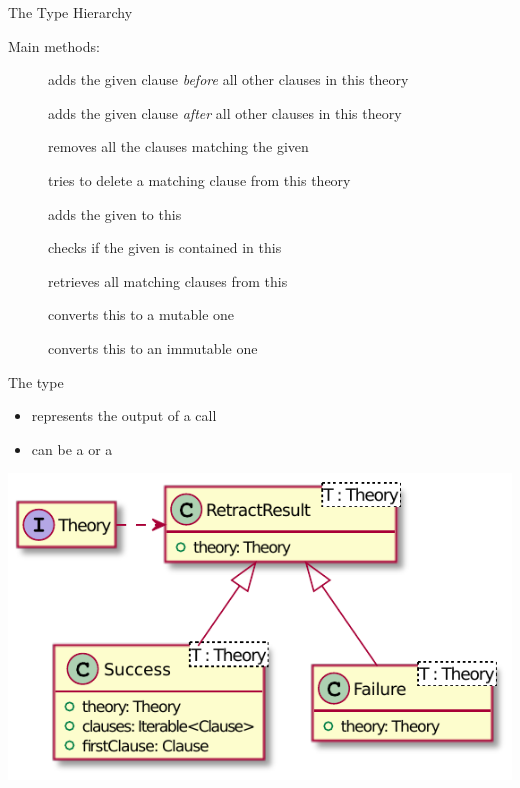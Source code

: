 \documentclass[handout]{beamer}
\begin{document}
\begin{frame}[allowframebreaks]{The  Type Hierarchy}
    \framebreak

    Main  methods:
    \begin{description}
        \item[] adds the given clause \textit{before} all other clauses in this theory
        \item[] adds the given clause \textit{after} all other clauses in this theory
        \item[] removes all the clauses matching the given 
        \item[] tries to delete a matching clause from this theory
    \end{description}

    \framebreak

    \begin{description}
        \item[] adds the given  to this
        \item[] checks if the given  is contained in this 
        \item[] retrieves all matching clauses from this 
        \item[] converts this  to a mutable one
        \item[] converts this  to an immutable one
    \end{description}

    \framebreak

    \begin{block}{The  type}
        \begin{itemize}
            \item represents the output of a  call
            \item can be a  or a 
        \end{itemize}
    \end{block}
    \begin{center}
        \includegraphics[width=0.7\linewidth]{img/retract-result.pdf}
    \end{center}

\end{frame}
\end{document}

